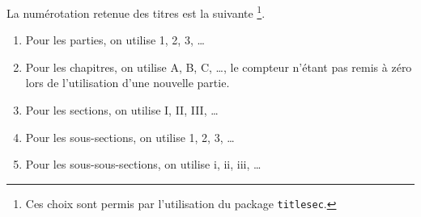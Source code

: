 La numérotation retenue des titres est la suivante
\footnote{
	Ces choix sont permis par l'utilisation du package \texttt{titlesec}.
}.

\begin{enumerate}
	\item Pour les parties, on utilise 1, 2, 3, \dots

	\item Pour les chapitres, on utilise A, B, C, \dots , le compteur n'étant pas remis à zéro lors de l'utilisation d'une nouvelle partie.

	\item Pour les sections, on utilise I, II, III, \dots

	\item Pour les sous-sections, on utilise 1, 2, 3, \dots

	\item Pour les sous-sous-sections, on utilise i, ii, iii, \dots
\end{enumerate}

